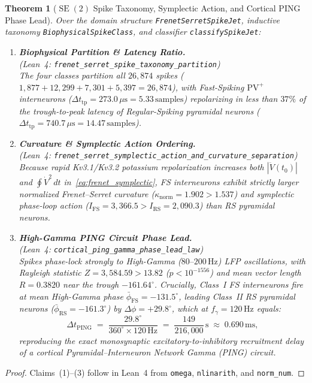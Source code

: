 \documentclass[11pt,letterpaper]{article}
\newcommand{\lean}[1]{\nolinkurl{#1}}
\newtheorem{theorem}{Theorem}[section]
\theoremstyle{definition}
\begin{document}
\begin{theorem}[$\operatorname{SE}(2)$ Spike Taxonomy, Symplectic Action, and Cortical PING Phase Lead]\label{thm:pillar5}
Over the domain structure \lean{FrenetSerretSpikeJet}, inductive taxonomy \lean{BiophysicalSpikeClass}, and classifier \lean{classifySpikeJet}:
\begin{enumerate}
  \item \textbf{Biophysical Partition \& Latency Ratio.}\\
  (\emph{Lean~4:} \lean{frenet_serret_spike_taxonomy_partition})\\
  The four classes partition all $26{,}874$ spikes ($1{,}877 + 12{,}299 + 7{,}301 + 5{,}397 = 26{,}874$), with Fast-Spiking $\text{PV}^+$ interneurons ($\Delta t_{\mathrm{tp}} = 273.0\,\mu\text{s} = 5.33\,\text{samples}$) repolarizing in less than $37\%$ of the trough-to-peak latency of Regular-Spiking pyramidal neurons ($\Delta t_{\mathrm{tp}} = 740.7\,\mu\text{s} = 14.47\,\text{samples}$).
  \item \textbf{Curvature \& Symplectic Action Ordering.}\\
  (\emph{Lean~4:} \lean{frenet_serret_symplectic_action_and_curvature_separation})\\
  Because rapid Kv3.1/Kv3.2 potassium repolarization increases both $|\ddot{V}(t_0)|$ and $\oint \dot{V}^2\,dt$ in~\eqref{eq:frenet_symplectic}, FS interneurons exhibit strictly larger normalized Frenet--Serret curvature ($\kappa_{\mathrm{norm}} = 1.902 > 1.537$) and symplectic phase-loop action ($I_{\mathrm{FS}} = 3{,}366.5 > I_{\mathrm{RS}} = 2{,}090.3$) than RS pyramidal neurons.
  \item \textbf{High-Gamma PING Circuit Phase Lead.}\\
  (\emph{Lean~4:} \lean{cortical_ping_gamma_phase_lead_law})\\
  Spikes phase-lock strongly to High-Gamma ($80\text{--}200\,\text{Hz}$) LFP oscillations, with Rayleigh statistic $Z = 3{,}584.59 > 13.82$ ($p < 10^{-1556}$) and mean vector length $R = 0.3820$ near the trough $-161.64^\circ$. Crucially, Class~I FS interneurons fire at mean High-Gamma phase $\bar{\phi}_{\mathrm{FS}} = -131.5^\circ$, leading Class~II RS pyramidal neurons ($\bar{\phi}_{\mathrm{RS}} = -161.3^\circ$) by \textbf{$\Delta\phi = +29.8^\circ$}, which at $f_\gamma = 120\,\text{Hz}$ equals:
  \begin{equation}\label{eq:ping_delay}
    \Delta t_{\mathrm{PING}} \;=\; \frac{29.8^\circ}{360^\circ \times 120\,\text{Hz}} \;=\; \frac{149}{216{,}000}\,\text{s} \;\approx\; 0.690\,\text{ms},
  \end{equation}
  reproducing the exact monosynaptic excitatory-to-inhibitory recruitment delay of a cortical Pyramidal--Interneuron Network Gamma (PING) circuit.
\end{enumerate}
\end{theorem}
\begin{proof}
Claims~(1)--(3) follow in Lean~4 from \texttt{omega}, \texttt{nlinarith}, and \texttt{norm\_num}.
\end{proof}
\end{document}
